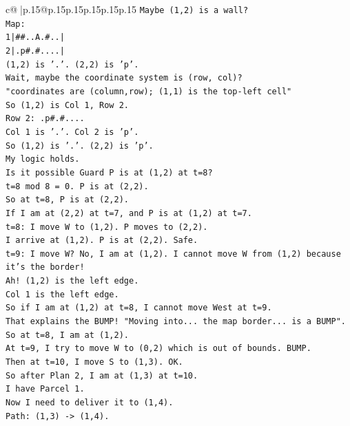 \documentclass{article}
\begin{document}
{\begin{supertabular}{c@{$\;$}|p{.15\linewidth}@{}p{.15\linewidth}p{.15\linewidth}p{.15\linewidth}p{.15\linewidth}p{.15\linewidth}}
{{{\texttt{Maybe (1,2) is a wall?} \\
\texttt{Map:} \\
\texttt{1|\#\#..A.\#..|} \\
\texttt{2|.p\#.\#....|} \\
\texttt{(1,2) is '.'. (2,2) is 'p'.} \\
\texttt{Wait, maybe the coordinate system is (row, col)?} \\
\texttt{"coordinates are (column,row); (1,1) is the top{-}left cell"} \\
\texttt{So (1,2) is Col 1, Row 2.} \\
\texttt{Row 2: .p\#.\#....} \\
\texttt{Col 1 is '.'. Col 2 is 'p'.} \\
\texttt{So (1,2) is '.'. (2,2) is 'p'.} \\
\texttt{My logic holds.} \\
\texttt{Is it possible Guard P is at (1,2) at t=8?} \\
\texttt{t=8 mod 8 = 0. P is at (2,2).} \\
\texttt{So at t=8, P is at (2,2).} \\
\texttt{If I am at (2,2) at t=7, and P is at (1,2) at t=7.} \\
\texttt{t=8: I move W to (1,2). P moves to (2,2).} \\
\texttt{I arrive at (1,2). P is at (2,2). Safe.} \\
\texttt{t=9: I move W? No, I am at (1,2). I cannot move W from (1,2) because it's the border!} \\
\texttt{Ah! (1,2) is the left edge.} \\
\texttt{Col 1 is the left edge.} \\
\texttt{So if I am at (1,2) at t=8, I cannot move West at t=9.} \\
\texttt{That explains the BUMP! "Moving into... the map border... is a BUMP".} \\
\texttt{So at t=8, I am at (1,2).} \\
\texttt{At t=9, I try to move W to (0,2) which is out of bounds. BUMP.} \\
\texttt{Then at t=10, I move S to (1,3). OK.} \\
\texttt{So after Plan 2, I am at (1,3) at t=10.} \\
\texttt{I have Parcel 1.} \\
\texttt{Now I need to deliver it to (1,4).} \\
\texttt{Path: (1,3) {-}> (1,4).} \\
}}}
\end{supertabular}}
\end{document}
